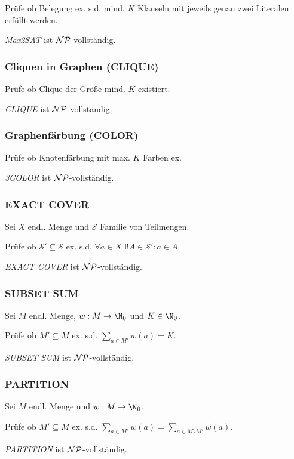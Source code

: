 Prüfe ob Belegung ex. s.d. mind. $K$ Klauseln mit jeweils genau zwei Literalen erfüllt werden.

\emph{Max2SAT} ist $\mathcal{NP}$-vollständig.

\subsubsection*{Cliquen in Graphen (CLIQUE)}

Prüfe ob Clique der Größe mind. $K$ existiert.

\emph{CLIQUE} ist $\mathcal{NP}$-vollständig.

\subsubsection*{Graphenfärbung (COLOR)}

Prüfe ob Knotenfärbung mit max. $K$ Farben ex.

\emph{3COLOR} ist $\mathcal{NP}$-vollständig.

\subsubsection*{EXACT COVER}

Sei $X$ endl. Menge und $\mathcal{S}$ Familie von Teilmengen.

Prüfe ob $\mathcal{S}' \subseteq \mathcal{S}$ ex. s.d. $\forall a \in X \exists! A \in \mathcal{S}' : a \in A$.

\emph{EXACT COVER} ist $\mathcal{NP}$-vollständig.

\subsubsection*{SUBSET SUM}

Sei $M$ endl. Menge, $w : M \to \N_0$ und $K \in \N_0$.

Prüfe ob $M' \subseteq M$ ex. s.d. $\sum_{a \in M'} w(a) = K$.

\emph{SUBSET SUM} ist $\mathcal{NP}$-vollständig.

\subsubsection*{PARTITION}

Sei $M$ endl. Menge und $w : M \to \N_0$.

Prüfe ob $M' \subseteq M$ ex. s.d. $\textstyle\sum\limits_{a \in M'} w(a) = \textstyle\sum\limits_{a \in M \setminus M'} w(a)$.

\emph{PARTITION} ist $\mathcal{NP}$-vollständig.

